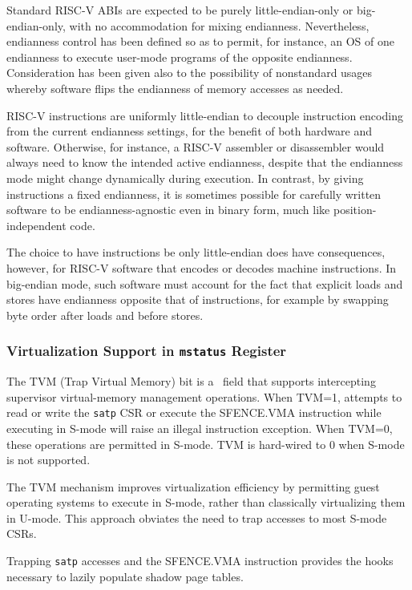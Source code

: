 \begin{commentary}
Standard RISC-V ABIs are expected to be purely little-endian-only or
big-endian-only, with no accommodation for mixing endianness.
Nevertheless, endianness control has been defined so as to permit, for
instance, an OS of one endianness to execute user-mode programs of the
opposite endianness.
Consideration has been given also to the possibility of nonstandard
usages whereby software flips the endianness of memory accesses as
needed.
\end{commentary}

\begin{commentary}
RISC-V instructions are uniformly little-endian to decouple instruction
encoding from the current endianness settings, for the benefit of both
hardware and software.
Otherwise, for instance, a RISC-V assembler or disassembler would always
need to know the intended active endianness, despite that the endianness
mode might change dynamically during execution.
In contrast, by giving instructions a fixed endianness, it is sometimes
possible for carefully written software to be endianness-agnostic even in
binary form, much like position-independent code.

The choice to have instructions be only little-endian does have
consequences, however, for RISC-V software that encodes or decodes
machine instructions.
In big-endian mode, such software must account for the fact that explicit
loads and stores have endianness opposite that of instructions, for
example by swapping byte order after loads and before stores.
\end{commentary}

\subsubsection{Virtualization Support in {\tt mstatus} Register}
\label{virt-control}

The TVM (Trap Virtual Memory) bit is a \warl\ field that supports intercepting
supervisor virtual-memory management operations.  When TVM=1,
attempts to read or write the {\tt satp} CSR or execute the SFENCE.VMA
instruction while executing in S-mode will raise an illegal instruction
exception.  When TVM=0, these operations are permitted in S-mode.
TVM is hard-wired to 0 when S-mode is not supported.

\begin{commentary}
The TVM mechanism improves virtualization efficiency by permitting guest
operating systems to execute in S-mode, rather than classically virtualizing
them in U-mode.  This approach obviates the need to trap accesses to most
S-mode CSRs.

Trapping {\tt satp} accesses and the SFENCE.VMA instruction provides the
hooks necessary to lazily populate shadow page tables.
\end{commentary}

